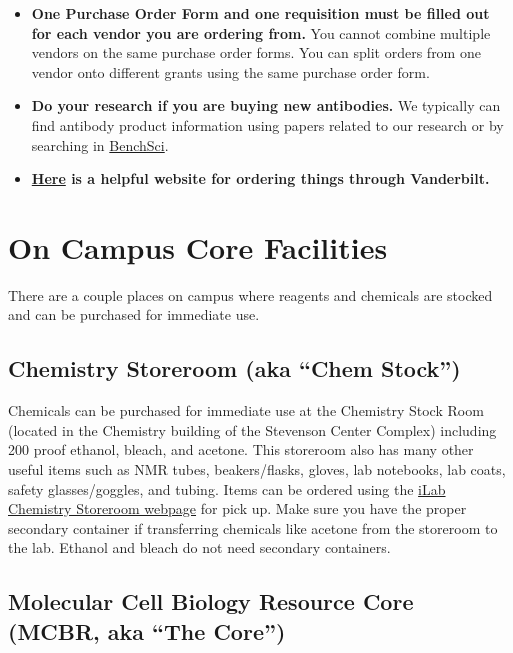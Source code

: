 \documentclass[
]{book}
\begin{document}
\begin{itemize}
\item
  \textbf{One Purchase Order Form and one requisition must be filled out for each vendor you are ordering from.} You cannot combine multiple vendors on the same purchase order forms. You can split orders from one vendor onto different grants using the same purchase order form.
\item
  \textbf{Do your research if you are buying new antibodies.} We typically can find antibody product information using papers related to our research or by searching in \href{https://www.benchsci.com/}{BenchSci}.
\item
  \textbf{\href{https://www.vanderbilt.edu/skyvu/procurement-requesters.php}{Here} is a helpful website for ordering things through Vanderbilt.}
\end{itemize}

\hypertarget{on-campus-core-facilities}{%
\section{On Campus Core Facilities}\label{on-campus-core-facilities}}

There are a couple places on campus where reagents and chemicals are stocked and can be purchased for immediate use.

\hypertarget{chemstock}{%
\subsection{Chemistry Storeroom (aka ``Chem Stock'')}\label{chemstock}}

Chemicals can be purchased for immediate use at the Chemistry Stock Room (located in the Chemistry building of the Stevenson Center Complex) including 200 proof ethanol, bleach, and acetone. This storeroom also has many other useful items such as NMR tubes, beakers/flasks, gloves, lab notebooks, lab coats, safety glasses/goggles, and tubing. Items can be ordered using the \href{https://vanderbilt.corefacilities.org/sc/4253/vanderbilt-chemical-storeroom/?tab=requests}{iLab Chemistry Storeroom webpage} for pick up. Make sure you have the proper secondary container if transferring chemicals like acetone from the storeroom to the lab. Ethanol and bleach do not need secondary containers.

\hypertarget{core}{%
\subsection{Molecular Cell Biology Resource Core (MCBR, aka ``The Core'')}\label{core}}
\end{document}
